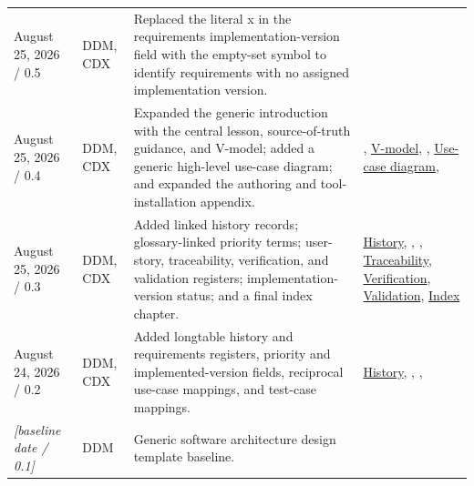 \begin{tabularx}{\linewidth}{L{3.1cm}L{2.2cm}YL{2.0cm}}
August 25, 2026 / 0.5 & DDM, CDX & Replaced the literal x in the requirements implementation-version field with the empty-set symbol to identify requirements with no assigned implementation version. & \\
August 25, 2026 / 0.4 & DDM, CDX & Expanded the generic introduction with the central lesson, source-of-truth guidance, and V-model; added a generic high-level use-case diagram; and expanded the authoring and tool-installation appendix. & , \hyperref[Figure:VModel]{V-model}, , \hyperref[Figure:UseCaseDiagram]{Use-case diagram}, \\
August 25, 2026 / 0.3 & DDM, CDX & Added linked history records; glossary-linked priority terms; user-story, traceability, verification, and validation registers; implementation-version status; and a final index chapter. & \hyperref[Table:DocumentHistory]{History}, , , \hyperref[Table:TraceabilityMatrix]{Traceability}, \hyperref[Table:VerificationRegister]{Veri\-fication}, \hyperref[Table:ValidationRegister]{Validation}, \hyperref[Chapter:Index]{Index}\\
August 24, 2026 / 0.2 & DDM, CDX & Added longtable history and requirements registers, priority and implemented-version fields, reciprocal use-case mappings, and test-case mappings. & \hyperref[Table:DocumentHistory]{History}, , , \\
\textit{[baseline date / 0.1]} & DDM & Generic software architecture design template baseline. & \\
\end{tabularx}
